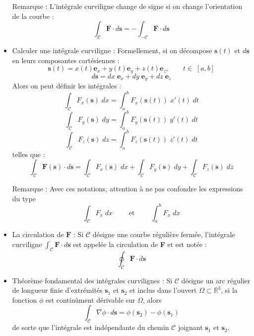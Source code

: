 \documentclass[a4paper]{article}
\begin{document}
\begin{itemize}
Remarque : L'intégrale curviligne change de signe si on change l'orientation de la courbe : \[ \int_\mathcal{C} \textbf{F} \cdot d \textbf{s} = - \int_{- \mathcal{C}} \textbf{F} \cdot d \textbf{s} \]






\item Calculer une intégrale curviligne : Formellement, si on décompose $ \textbf{s}(t) $ et $ d \textbf{s} $ en leurs composantes cartésiennes : 
\[ \textbf{s}(t) = x(t) \textbf{e}_x + y(t) \textbf{e}_y + z(t) \textbf{e}_z, \qquad t \in \; [a, b] \]
\[ d \textbf{s} = d x \; \textbf{e}_x + d y \; \textbf{e}_y + d z \; \textbf{e}_z \]
Alors on peut définir les intégrales : 
\[ \int_\mathcal{C} F_x(\textbf{s}) \; d x = \int_a^b F_x(\textbf{s}(t)) \; x'(t) \; d t \]
\[ \int_\mathcal{C} F_y(\textbf{s}) \; d y = \int_a^b F_y(\textbf{s}(t)) \; y'(t) \; d t \]
\[ \int_\mathcal{C} F_z(\textbf{s}) \; d z = \int_a^b F_z(\textbf{s}(t)) \; z'(t) \; d t \]
telles que : 
\[ \int_\mathcal{C} \textbf{F}(\textbf{s}) \cdot d \textbf{s} = \int_\mathcal{C} F_x(\textbf{s}) \; d x + \int_\mathcal{C} F_y(\textbf{s}) \; d y +  \int_\mathcal{C} F_z(\textbf{s}) \; d z \]

Remarque : Avec ces notations, attention à ne pas confondre les expressions du type 
\[ \int_\mathcal{C} F_x \; d x \qquad \text{ et } \qquad \int_a^b F_x \; d x \]






\item La circulation de $ \textbf{F} $ : Si $ \mathcal{C} $ désigne une courbe régulière fermée, l'intégrale curviligne $\displaystyle \int_\mathcal{C} \textbf{F} \cdot d \textbf{s} $ est appelée la circulation de \textbf{F} et est notée : 
\[ \oint_\mathcal{C} \textbf{F} \cdot d \textbf{s} \]






\item Théorème fondamental des intégrales curvilignes : Si $ \mathcal{C} $ désigne un arc régulier de longueur finie d'extrémités $ \textbf{s}_1 $ et $ \textbf{s}_2 $ et inclus dans l'ouvert $ \Omega \subset \mathbb{R}^3 $, si la fonction $ \phi $ est continûment dérivable sur $ \Omega $, alors \[ \int_\mathcal{C} \nabla \phi \cdot d \textbf{s} = \phi(\textbf{s}_2) - \phi(\textbf{s}_1) \]
de sorte que l'intégrale est indépendante du chemin $ \mathcal{C} $ joignant $ \textbf{s}_1 $ et $ \textbf{s}_2 $.







\end{itemize}
\end{document}
